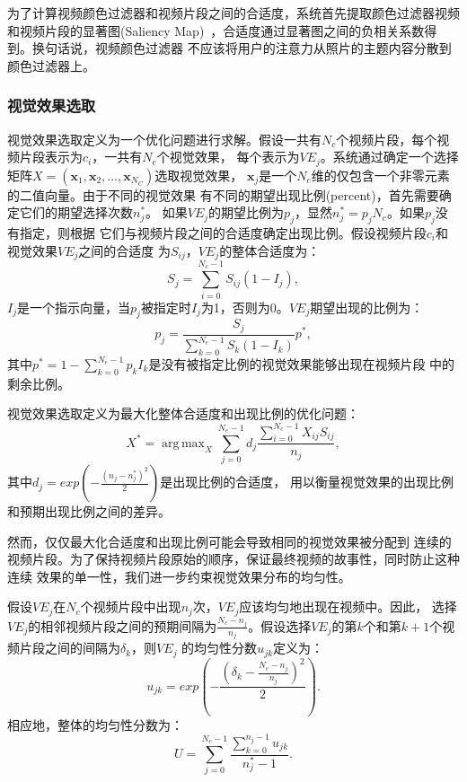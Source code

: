 \documentclass[doctor]{ustcthesis}
\def \x {\mathbf{x}}
\DeclareMathOperator*{\argmax}{arg\,max}
\begin{document}
为了计算视频颜色过滤器和视频片段之间的合适度，系统首先提取颜色过滤器视频和视频片段的显著图(Saliency
Map)~\cite{ma2003saliency}，合适度通过显著图之间的负相关系数得到。换句话说，视频颜色过滤器
不应该将用户的注意力从照片的主题内容分散到颜色过滤器上。

\subsubsection{视觉效果选取}
视觉效果选取定义为一个优化问题进行求解。假设一共有$N_c$个视频片段，每个视频片段表示为$c_i$，一共有$N_e$个视觉效果，
每个表示为$VE_j$。系统通过确定一个选择矩阵$X=(\x_1, \x_2, \ldots, \x_{N_C})$选取视觉效果，
$\x_j$是一个$N_e$维的仅包含一个非零元素的二值向量。由于不同的视觉效果
有不同的期望出现比例(percent)，首先需要确定它们的期望选择次数$n_j^*$。
如果$VE_j$的期望比例为$p_j$，显然$n_j^* = p_jN_c$。如果$p_j$没有指定，则根据
它们与视频片段之间的合适度确定出现比例。假设视频片段$c_i$和视觉效果$VE_j$之间的合适度
为$S_{ij}$，$VE_j$的整体合适度为：
\begin{equation}
    S_j = \sum_{i=0}^{N_c-1}S_{ij}(1 - I_j),
\end{equation}
$I_j$是一个指示向量，当$p_j$被指定时$I_j$为1，否则为0。$VE_j$期望出现的比例为：
\begin{equation}
    p_j = \frac{S_j}{\sum_{k=0}^{N_e-1}S_{k}(1 - I_{k})}p^*,
\end{equation}
其中$p^* = 1 -\sum_{k=0}^{N_e-1}p_{k}I_{k}$是没有被指定比例的视觉效果能够出现在视频片段
中的剩余比例。

视觉效果选取定义为最大化整体合适度和出现比例的优化问题：
\begin{equation}
    X^* = \argmax_{X}
    \sum_{j=0}^{N_e-1}d_j\frac{\sum_{i=0}^{N_c-1}X_{ij}S_{ij}}{n_j},
\end{equation}
其中$d_j = exp(-\frac{(n_j-n_j^*)^2}{2})$是出现比例的合适度，
用以衡量视觉效果的出现比例和预期出现比例之间的差异。

然而，仅仅最大化合适度和出现比例可能会导致相同的视觉效果被分配到
连续的视频片段。为了保持视频片段原始的顺序，保证最终视频的故事性，同时防止这种连续
效果的单一性，我们进一步约束视觉效果分布的均匀性。

假设$VE_j$在$N_c$个视频片段中出现$n_j$次，$VE_j$应该均匀地出现在视频中。因此，
选择$VE_j$的相邻视频片段之间的预期间隔为$\frac{N_c -
n_j}{n_j}$。假设选择$VE_j$的第$k$个和第$k+1$个视频片段之间的间隔为$\delta_k$，则$VE_j$
的均匀性分数$u_{jk}$定义为：
\begin{equation}
    u_{jk} = exp(-\frac{(\delta_{k}-\frac{N_c-n_j}{n_j})^2}{2}).
\end{equation}
相应地，整体的均匀性分数为：
\begin{equation}
    U = \sum_{j=0}^{N_e-1}\frac{\sum_{k=0}^{n_j-1}u_{jk}}{n_j^*-1}.
\end{equation}
\end{document}

